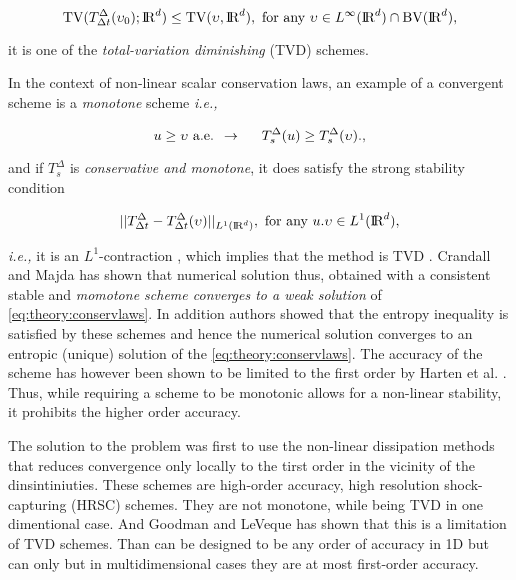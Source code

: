 \begin{equation}
\text{TV}(T_{\Delta t} ^{\Delta}(\upsilon_0); \text{I\!R}^d) \leq \text{TV}(\upsilon,  \text{I\!R}^d), \text{ for any } \upsilon\in L^{\infty}(\text{I\!R}^d)\cap \text{BV}(\text{I\!R}^d),
\end{equation}

it is one of the \textit{total-variation diminishing} (TVD) schemes. 

In the context of non-linear scalar conservation laws, an example of a convergent scheme is a \textit{monotone} scheme \textit{i.e.,}

\begin{equation}
u \geq \upsilon \text{ a.e. } \rightarrow \hspace{5mm} T_{s}^{\Delta}(u) \geq T_{s}^{\Delta}(\upsilon).,
\end{equation}

and if $T_{s}^{\Delta}$ is \textit{conservative and monotone}, it does satisfy the strong stability condition 

\begin{equation}
|| T^{\Delta} _{\Delta t} - T^{\Delta} _{\Delta t}(\upsilon)||_{L^1(\text{I\!R}^d)}, \text{  for any  } u.\upsilon\in L^1(\text{I\!R}^d),
\end{equation}

\textit{i.e.,} it is an $L^1$-contraction \cite{Crandall:1980proc}, which implies that the method is TVD \cite{LeVeque:1992}. 
Crandall and Majda \cite{Crandall:1980} has shown that numerical solution thus, obtained with a consistent stable and \textit{momotone scheme converges to a weak solution} of \ref{eq:theory:conservlaws}. 
In addition authors showed that the entropy inequality is satisfied by these schemes and hence the numerical solution converges to an entropic (unique) solution of the \ref{eq:theory:conservlaws}. 
The accuracy of the scheme has however been shown to be limited to the first order by Harten et al. \cite{Harten:1976}. 
Thus, while requiring a scheme to be monotonic allows for a non-linear stability, it prohibits the higher order accuracy.

The solution to the problem was first to use the non-linear dissipation methods that reduces convergence only locally to the tirst order in the vicinity of the dinsintiniuties. 
These schemes are high-order accuracy, high resolution shock-capturing (HRSC) schemes. 
They are not monotone, while being TVD in one dimentional case. And Goodman and LeVeque \cite{Goodman:1985} has shown that this is a limitation of TVD schemes. Than can be designed to be any order of accuracy in 1D but can only but in multidimensional cases they are at most first-order accuracy. 


